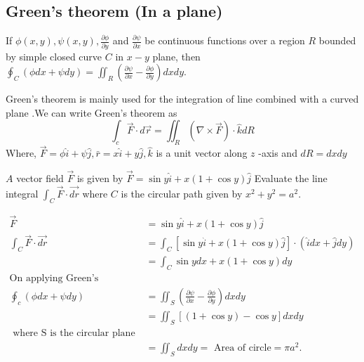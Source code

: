 \subsection{Green's theorem (In a plane)}
\begin{definition}
 If $\phi(x, y), \psi(x, y), \frac{\partial \phi}{\partial y}$ and $\frac{\partial \psi}{\partial x}$ be continuous functions over a region $R$ bounded by simple closed curve $C$ in $x-y$ plane, then  $\oint_{C}(\phi d x+\psi d y)=\iint_{R}\left(\frac{\partial \psi}{\partial x}-\frac{\partial \phi}{\partial y}\right) d x d y. \quad$ 
\end{definition}
Green’s theorem is mainly used for the integration of line combined with a curved plane
.We can write  Green's theorem as
$$
\int_{c} \vec{F} \cdot d \vec{r}=\iint_{R}(\nabla \times \vec{F}) \cdot \hat{k} d R
$$
Where, $\vec{F}=\phi \hat{i}+\psi \hat{j}, \bar{r}=x \hat{i}+y \hat{j}, \hat{k}$ is a unit vector along $z$ -axis and $d R=d x d y$
\begin{exercise}
	$A$ vector field $\vec{F}$ is given by $\vec{F}=\sin y \hat{i}+x(1+\cos y) \hat{j}$ Evaluate the line integral $\int_{C} \vec{F} \cdot \overrightarrow{d r}$ where $C$ is the circular path given by $x^{2}+y^{2}=a^{2} .$\end{exercise}
\begin{answer}
	 $$\begin{aligned}
		\vec{F}&=\sin y \hat{i}+x(1+\cos y) \hat{j}\\
		\int_{C} \vec{F} \cdot \overrightarrow{d r}&=\int_{C}[\sin y \hat{i}+x(1+\cos y) \hat{j}] \cdot(\hat{i} d x+\hat{j} d y)\\&=\int_{C} \sin y d x+x(1+\cos y) d y\\
		\text{On applying Green's Theorem, we have}\\
		\oint_{c}(\phi d x+\psi d y)&=\iint_{S}\left(\frac{\partial \psi}{\partial x}-\frac{\partial \phi}{\partial y}\right) d x d y\\
		&=\iint_{S}[(1+\cos y)-\cos y] d x d y\\
		\text{ where S is the circular plane surface of radius a.}\\&=\iint_{S} d x d y=\text{ Area of circle} =\pi a^{2} . 
	\end{aligned}$$
	
\end{answer}

